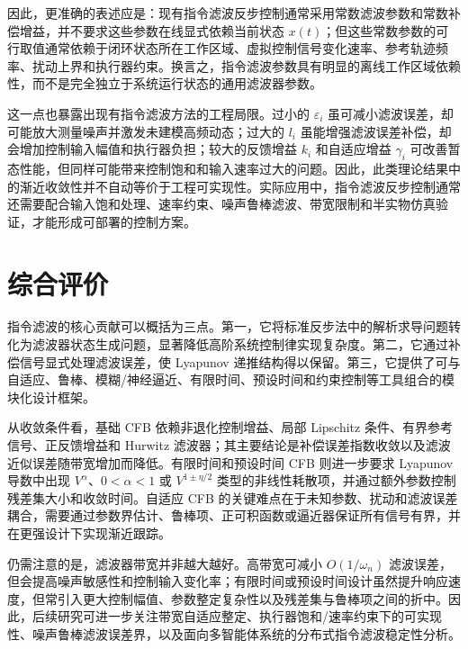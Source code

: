 \documentclass[UTF8,a4paper,11pt,fontset=fandol]{ctexart}
\begin{document}
因此，更准确的表述应是：现有指令滤波反步控制通常采用常数滤波参数和常数补偿增益，并不要求这些参数在线显式依赖当前状态 $x(t)$；但这些常数参数的可行取值通常依赖于闭环状态所在工作区域、虚拟控制信号变化速率、参考轨迹频率、扰动上界和执行器约束。换言之，指令滤波参数具有明显的离线工作区域依赖性，而不是完全独立于系统运行状态的通用滤波器参数。

这一点也暴露出现有指令滤波方法的工程局限。过小的 $\varepsilon_i$ 虽可减小滤波误差，却可能放大测量噪声并激发未建模高频动态；过大的 $l_i$ 虽能增强滤波误差补偿，却会增加控制输入幅值和执行器负担；较大的反馈增益 $k_i$ 和自适应增益 $\gamma_i$ 可改善暂态性能，但同样可能带来控制饱和和输入速率过大的问题。因此，此类理论结果中的渐近收敛性并不自动等价于工程可实现性。实际应用中，指令滤波反步控制通常还需要配合输入饱和处理、速率约束、噪声鲁棒滤波、带宽限制和半实物仿真验证，才能形成可部署的控制方案。

\section{综合评价}

指令滤波的核心贡献可以概括为三点。第一，它将标准反步法中的解析求导问题转化为滤波器状态生成问题，显著降低高阶系统控制律实现复杂度。第二，它通过补偿信号显式处理滤波误差，使 Lyapunov 递推结构得以保留。第三，它提供了可与自适应、鲁棒、模糊/神经逼近、有限时间、预设时间和约束控制等工具组合的模块化设计框架。

从收敛条件看，基础 CFB 依赖非退化控制增益、局部 Lipschitz 条件、有界参考信号、正反馈增益和 Hurwitz 滤波器；其主要结论是补偿误差指数收敛以及滤波近似误差随带宽增加而降低。有限时间和预设时间 CFB 则进一步要求 Lyapunov 导数中出现 $V^\alpha$、$0<\alpha<1$ 或 $V^{1\pm\eta/2}$ 类型的非线性耗散项，并通过额外参数控制残差集大小和收敛时间。自适应 CFB 的关键难点在于未知参数、扰动和滤波误差耦合，需要通过参数界估计、鲁棒项、正可积函数或逼近器保证所有信号有界，并在更强设计下实现渐近跟踪。

仍需注意的是，滤波器带宽并非越大越好。高带宽可减小 $O(1/\omega_n)$ 滤波误差，但会提高噪声敏感性和控制输入变化率；有限时间或预设时间设计虽然提升响应速度，但常引入更大控制幅值、参数整定复杂性以及残差集与鲁棒项之间的折中。因此，后续研究可进一步关注带宽自适应整定、执行器饱和/速率约束下的可实现性、噪声鲁棒滤波误差界，以及面向多智能体系统的分布式指令滤波稳定性分析。
\end{document}
